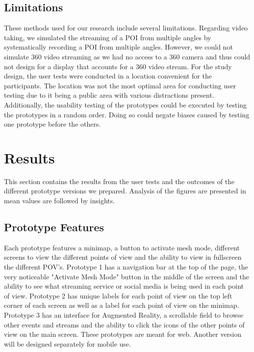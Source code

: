 \documentclass{sigchi}
\begin{document}
\subsection{Limitations}
These methods used for our research include several limitations. Regarding video taking, we simulated the streaming of a POI from multiple angles by systematically recording a POI from multiple angles. However, we could not simulate 360 video streaming as we had no access to a 360 camera and thus could not design for a display that accounts for a 360 video stream. For the study design, the user tests were conducted in a location convenient for the participants. The location was not the most optimal area for conducting user testing due to it being a public area with various distractions present. Additionally, the usability testing of the prototypes could be executed by testing the prototypes in a random order. Doing so could negate biases caused by testing one prototype before the others.

\section{Results}
This section contains the results from the user tests and the outcomes of the different prototype versions we prepared. Analysis of the figures are presented in mean values are followed by insights. 

\subsection{Prototype Features}
Each prototype features a minimap, a button to activate mesh mode, different screens to view the different points of view and the ability to view in fullscreen the different POV's. Prototype 1 has a navigation bar at the top of the page, the very noticeable "Activate Mesh Mode" button in the middle of the screen and the ability to see what streaming service or social media is being used in each point of view. Prototype 2 has unique labels for each point of view on the top left corner of each screen as well as a label for each point of view on the minimap. Prototype 3 has an interface for Augmented Reality, a scrollable field to browse other events and streams and the ability to click the icons of the other points of view on the main screen. These prototypes are meant for web. Another version will be designed separately for mobile use.
\end{document}
